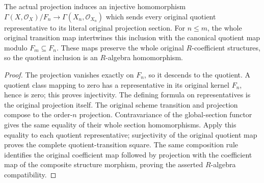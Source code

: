 \begin{lemma}
\label{lem:fibre-infinitesimal-global-quotient-transition}
\leanok
The actual projection induces an injective homomorphism
$\Gamma(X,\mathcal O_X)/F_n\to\Gamma(X_n,\mathcal O_{X_n})$
which sends every original quotient representative to its literal
original projection section. For $n\le m$, the whole original
transition map intertwines this inclusion with the canonical quotient
map modulo $F_m\subseteq F_n$. These maps preserve the whole original
$R$-coefficient structures, so the quotient inclusion is an
$R$-algebra homomorphism.
\end{lemma}
\begin{proof}
The projection vanishes exactly on $F_n$, so it descends to the quotient.
A quotient class mapping to zero has a representative in its original
kernel $F_n$, hence is zero; this proves injectivity. The defining
formula on representatives is the original projection itself. The
original scheme transition and projection compose to the order-$n$
projection. Contravariance of the global-section functor gives the
same equality of their whole section homomorphisms. Apply this equality
to each quotient representative; surjectivity of the original quotient
map proves the complete quotient-transition square. The same
composition rule identifies the original coefficient map followed by
projection with the coefficient map of the composite structure
morphism, proving the asserted $R$-algebra compatibility.
\end{proof}
